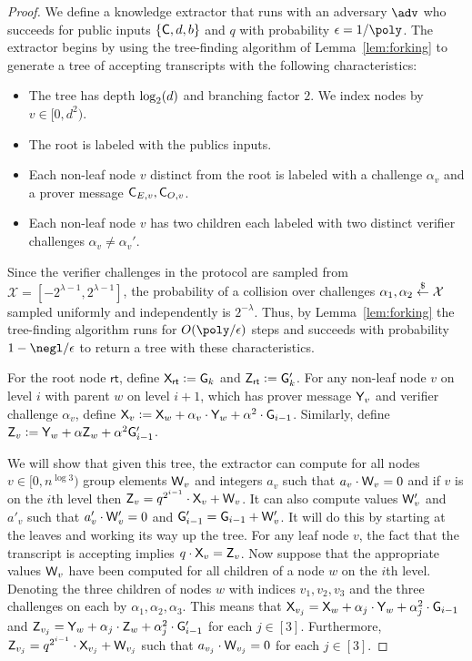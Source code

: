 \documentclass[12pt]{article}
\theoremstyle{Definition}
\begin{document}
\begin{proof}
		We define a knowledge extractor that runs with an adversary $\adv$ who succeeds for public inputs $\{\mathsf{C},d,b \}$ and $q$ with probability $\epsilon = 1/\poly$. The extractor begins by using the tree-finding algorithm of Lemma~\ref{lem:forking} to generate a tree of accepting transcripts with the following characteristics: 
\begin{itemize}
\item The tree has depth $\log_2(d)$ and branching factor $2$. We index nodes by $v \in [0, d^2)$.
\item The root is labeled with the publics inputs. 
\item Each non-leaf node $v$ distinct from the root is labeled with a challenge $\alpha_{v}$ and a prover message $\mathsf{C}_{E,v},\mathsf{C}_{O,v}$. 
\item Each non-leaf node $v$ has two children each labeled with two distinct verifier challenges 
$\alpha_{v} \neq \alpha_{v}'$.

\end{itemize} 

Since the verifier challenges in the protocol are sampled from $\mathcal{X} = [-2^{\lambda -1}, 2^{\lambda -1}]$, the probability of a collision over challenges $\alpha_1, \alpha_2 \overset{\$}{\gets} \mathcal{X}$ sampled uniformly and independently is $2^{-\lambda}$. Thus, by Lemma~\ref{lem:forking} the tree-finding algorithm runs for $O(\poly/\epsilon)$ steps and succeeds with probability $1 - \negl/\epsilon$ to return a tree with these characteristics.

For the root node $\textsf{rt}$, define $\mathsf{X}_\textsf{rt} \mathrel{\mathop:}= \mathsf{G}_k$ and $\mathsf{Z}_\textsf{rt} \mathrel{\mathop:}= \mathsf{G}'_k$. For any non-leaf node $v$ on level $i$ with parent $w$ on level $i+1$, which has prover message $\mathsf{Y}_v$ and verifier challenge $\alpha_v$, define $\mathsf{X}_v \mathrel{\mathop:}= \mathsf{X}_w + \alpha_v \cdot \mathsf{Y}_w + \alpha^2 \cdot \mathsf{G}_{i-1}$. Similarly, define $\mathsf{Z}_v \mathrel{\mathop:}= \mathsf{Y}_w + \alpha \mathsf{Z}_w + \alpha^2 \mathsf{G}'_{i-1}$.

We will show that given this tree, the extractor can compute for all nodes $v \in [0, n^{\log 3})$ group elements $\mathsf{W}_v$ and integers $a_v$ such that $a_v \cdot \mathsf{W}_v = 0$ and if $v$ is on the $i$th level then $\mathsf{Z}_v = q^{2^{i-1}} \cdot \mathsf{X}_v + \mathsf{W}_v$. It can also compute values $\mathsf{W}'_v$ and $a'_v$ such that $a'_v \cdot \mathsf{W}'_v = 0$ and $\mathsf{G}'_{i-1} = \mathsf{G}_{i-1} + \mathsf{W}'_v$. It will do this by starting at the leaves and working its way up the tree.
For any leaf node $v$, the fact that the transcript is accepting implies $q \cdot \mathsf{X}_v = \mathsf{Z}_v$. Now suppose that the appropriate values $\mathsf{W}_v$ have been computed for all children of a node $w$ on the $i$th level. Denoting the three children of nodes $w$ with indices $v_1, v_2, v_3$ and the three challenges on each by $\alpha_1, \alpha_2, \alpha_3$. This means that $\mathsf{X}_{v_j} = \mathsf{X}_w + \alpha_j \cdot \mathsf{Y}_w + \alpha_j^2 \cdot \mathsf{G}_{i-1}$ and $\mathsf{Z}_{v_j} = \mathsf{Y}_w + \alpha_j \cdot \mathsf{Z}_w + \alpha^2_j \cdot \mathsf{G}'_{i-1}$ for each $j \in [3]$.
Furthermore, $\mathsf{Z}_{v_j} = q^{2^{i-1}} \cdot \mathsf{X}_{v_j} + \mathsf{W}_{v_j}$ such that $a_{v_j} \cdot \mathsf{W}_{v_j} = 0$ for each $j \in [3]$. 


\end{proof}
\end{document}
